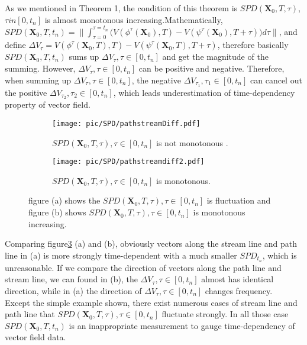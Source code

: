 \documentclass[
     11pt,         %
     a4paper,      %
     oneside,
     ]{article}
\newcommand{\vect}[1]{\boldsymbol{#1}}
\begin{document}
\begin{itemize}
    	As we mentioned in Theorem 1, the condition of this theorem is $SPD(\vect{X}_{0},T,\tau)$,$\tau in [0, t_{n}]$ is almost monotonous increasing.Mathematically, $	SPD(\vect{X}_{0},T,t_{n})=\biggr\lVert\int_{\tau=0}^{\tau=t_{n}}\biggr( V(\phi^{\tau}(\vect{X}_{0}),T)-V(\psi^{\tau}(\vect{X}_{0}),T+\tau)\biggr) d\tau\biggr\rVert$, and define $\Delta V_{\tau}=V(\phi^{\tau}(\vect{X}_{0},T),T)-V(\psi^{\tau}(\vect{X}_{0},T),T+\tau)$, therefore basically $SPD(\vect{X}_{0},T,t_{n})$ sums up $\Delta V_{\tau},\tau\in[0,t_{n}]$ and get the magnitude of the summing. However, $\Delta V_{\tau},\tau\in[0,t_{n}]$ can be positive and negative. Therefore, when summing up $\Delta V_{\tau},\tau\in[0,t_{n}]$, the negative $\Delta V_{\tau_{1}}, \tau_{1}\in[0,t_{n}]$ can cancel out the positive $\Delta V_{\tau_{2}}, \tau_{2}\in[0,t_{n}]$, which leads underestimation of time-dependency property of vector field.\\
    	\begin{figure}[H]
    		\begin{subfigure}{0.45\textwidth}
    			\centering
    			\texttt{[image: pic/SPD/pathstreamDiff.pdf]}
    			\caption{$SPD(\vect{X}_{0},T,\tau), \tau\in[0,t_{n}]$ is not monotonous .}
    			\label{fig:fluctuationSPD}
    		\end{subfigure}
    		\begin{subfigure}{0.45\textwidth}
    			\centering
    			\texttt{[image: pic/SPD/pathstreamdiff2.pdf]}
    			\caption{ $SPD(\vect{X}_{0},T,\tau), \tau\in[0,t_{n}]$ is  monotonous.}
    			\label{fig:monotonousSPD}
    		\end{subfigure}
    			\caption{{\tiny figure (a) shows the $SPD(\vect{X}_{0},T,\tau), \tau\in[0,t_{n}]$ is fluctuation and figure (b) shows $SPD(\vect{X}_{0},T,\tau), \tau\in[0,t_{n}]$ is monotonous increasing.}}
    			\label{fig:SPDfluctuationCompare}
    	\end{figure}
    	Comparing figure\ref{fig:SPDfluctuationCompare} (a) and (b), obviously vectors along the stream line and path line in (a) is more strongly time-dependent with a much smaller $SPD_{t_{n}}$, which is unreasonable. If we compare the direction of vectors along the path line and stream line, we can found in (b), the $\Delta V_{\tau},\tau\in[0,t_{n}]$ almost has identical direction, while in (a) the direction of $\Delta V_{\tau},\tau\in[0,t_{n}]$ changes frequency.\\
    	Except the simple example shown, there exist numerous cases of stream line and path line that $SPD(\vect{X}_{0},T,\tau), \tau\in[0,t_{n}]$ fluctuate strongly. In all those case $SPD(\vect{X}_{0},T,t_{n})$ is an inappropriate measurement to gauge time-dependency of vector field data.

\end{itemize}
\end{document}

